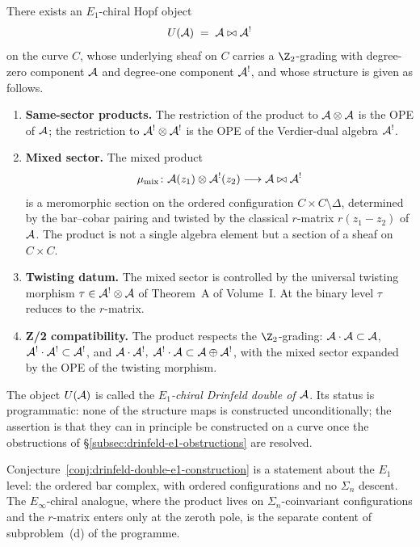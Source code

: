 \begin{conjecture}
\label{conj:drinfeld-double-e1-construction}
There exists an $E_1$-chiral Hopf object
\[
U(\mathcal{A}) \;=\; \mathcal{A} \bowtie \mathcal{A}^!
\]
on the curve $C$, whose underlying sheaf on $C$ carries a
$\Z_2$-grading with degree-zero component $\mathcal{A}$ and
degree-one component $\mathcal{A}^!$, and whose structure is given
as follows.
\begin{enumerate}[label=\textup{(D\arabic*)}, leftmargin=*]
\item \textbf{Same-sector products.} The restriction of the
product to $\mathcal{A} \otimes \mathcal{A}$ is the OPE of $\mathcal{A}$; the
restriction to $\mathcal{A}^! \otimes \mathcal{A}^!$ is the OPE of the
Verdier-dual algebra $\mathcal{A}^!$.
\item \textbf{Mixed sector.} The mixed product
\[
\mu_{\mathrm{mix}}\colon\mathcal{A}(z_1) \otimes \mathcal{A}^!(z_2) \longrightarrow
\mathcal{A} \bowtie \mathcal{A}^!
\]
is a meromorphic section on the ordered configuration
$C\times C \setminus \Delta$, determined by the
bar--cobar pairing and twisted by the classical $r$-matrix
$r(z_1 - z_2)$ of $\mathcal{A}$. The product is not a single
algebra element but a section of a sheaf on $C\times C$.
\item \textbf{Twisting datum.} The mixed sector is
controlled by the universal twisting morphism
$\tau\in\mathcal{A}^!\otimes\mathcal{A}$ of Theorem~A of Volume~I.
At the binary level $\tau$ reduces to the $r$-matrix.
\item \textbf{Z/2 compatibility.} The product respects the
$\Z_2$-grading: $\mathcal{A}\cdot\mathcal{A}\subset\mathcal{A}$,
$\mathcal{A}^!\cdot\mathcal{A}^!\subset\mathcal{A}^!$, and
$\mathcal{A}\cdot\mathcal{A}^!,\;\mathcal{A}^!\cdot\mathcal{A}\subset\mathcal{A}\oplus\mathcal{A}^!$,
with the mixed sector expanded by the OPE of the twisting
morphism.
\end{enumerate}
The object $U(\mathcal{A})$ is called the \emph{$E_1$-chiral
Drinfeld double of $\mathcal{A}$}. Its status is programmatic:
none of the structure maps is constructed unconditionally;
the assertion is that they can in principle be constructed
on a curve once the obstructions of
\S\ref{subsec:drinfeld-e1-obstructions} are resolved.
\end{conjecture}

Conjecture~\ref{conj:drinfeld-double-e1-construction}
is a statement about the $E_1$ level: the ordered bar
complex, with ordered configurations and no $\Sigma_n$
descent. The $E_\infty$-chiral analogue, where the product
lives on $\Sigma_n$-coinvariant configurations and the
$r$-matrix enters only at the zeroth pole, is the separate
content of subproblem~(d) of the programme.

